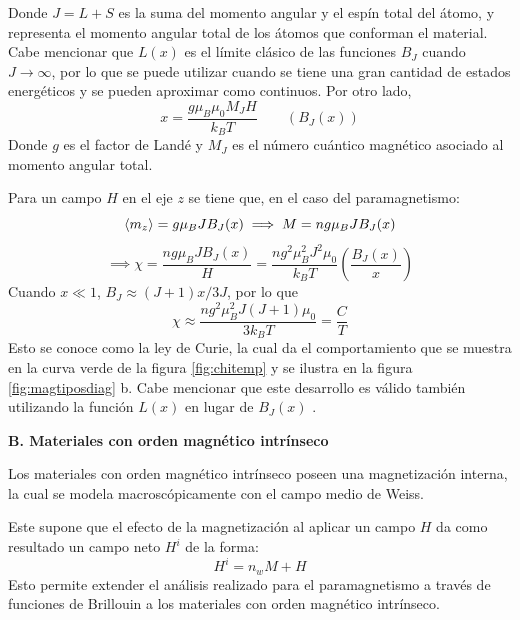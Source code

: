 \documentclass[../main.tex]{subfiles}
\begin{document}
\begin{itemize}
\begin{equation}
    \end{equation}
    Donde $J=L+S$ es la suma del momento angular y el espín total del átomo, y representa el momento angular total de los átomos que conforman el material. Cabe mencionar que $L(x)$ es el límite clásico de las funciones $B_J$ cuando $J\rightarrow\infty$, por lo que se puede utilizar cuando se tiene una gran cantidad de estados energéticos y se pueden aproximar como continuos. Por otro lado,
    \begin{equation}
        x=\dfrac{g\mu_B\mu_0M_JH}{k_BT}\qquad (B_J(x))
        \label{eq:xBrillouin}
    \end{equation}
    Donde $g$ es el factor de Landé y $M_J$ es el número cuántico magnético asociado al momento angular total.

    Para un campo $H$ en el eje $z$ se tiene que, en el caso del paramagnetismo:
    \begin{equation}
            \langle m_z \rangle=g\mu_BJB_J(x) \implies M=ng\mu_B J B_J(x)
        \label{eq:momentozetaparam}
    \end{equation}
    \begin{equation}
        \implies \chi=\dfrac{ng\mu_B J B_J(x)}{H}=\dfrac{n g^2 \mu_B^2 J^2 \mu_0}{k_BT}\left(\dfrac{B_J(x)}{x}\right)
        \label{eq:chiparam}
    \end{equation}
    Cuando $x\ll1$, $B_J\approx(J+1)x/3J$, por lo que
    \begin{equation}
        \chi\approx\dfrac{ng^2\mu_B^2J(J+1)\mu_0}{3k_BT}=\dfrac{C}{T}
        \label{eq:leycurie}
    \end{equation}
    Esto se conoce como la ley de Curie, la cual da el comportamiento que se muestra en la curva verde de la figura \ref{fig:chitemp} y se ilustra en la figura \ref{fig:magtiposdiag} b. Cabe mencionar que este desarrollo es válido también utilizando la función $L(x)$ en lugar de $B_J(x)$ \cite{coey2010magnetism}.
\end{itemize}
\textbf{B. Materiales con orden magnético intrínseco}

Los materiales con orden magnético intrínseco poseen una magnetización interna, la cual se modela macroscópicamente con el campo medio de Weiss.

Este supone que el efecto de la magnetización al aplicar un campo $H$ da como resultado un campo neto $H^i$ de la forma:
\begin{equation}
    H^i=n_wM+H
    \label{eq:Weiss}
\end{equation}
Esto permite extender el análisis realizado para el paramagnetismo a través de funciones de Brillouin a los materiales con orden magnético intrínseco.
\end{document}
